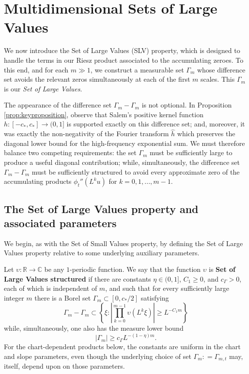 \documentclass[12pt]{amsart}
\numberwithin{equation}{section}
\begin{document}
\section{Multidimensional Sets of Large Values}\label{sec:multiSLV}

We now introduce the Set of Large Values (SLV) property, which is designed to handle the terms in our Riesz product associated to the accumulating zeroes. To this end, and for each $m \gg 1$, we construct a measurable set $\Gamma_m$ whose difference set avoids the relevant zeros simultaneously at each of the first $m$ scales.  This $\Gamma_m$ is our \textit{Set of Large Values}.

The appearance of the difference set $\Gamma_m-\Gamma_m$ is not optional.  In Proposition \ref{prop:keyproposition}, observe that Salem's positive kernel function $h : [-c_*,c_*] \rightarrow (0,1]$ is supported exactly on this difference set; and, moreover, it was exactly the non-negativity of the Fourier transform $\hat{h}$ which preserves the diagonal lower bound for the high-frequency exponential sum.  We must therefore balance two competing requirements:  the set $\Gamma_m$ must be sufficiently large to produce a useful diagonal contribution; while, simultaneously, the difference set $\Gamma_m-\Gamma_m$ must be sufficiently structured to avoid every approximate zero of the accumulating products $\phi_t'' (L^k u)$ for $k = 0,1,...,m-1$.

\subsection{The Set of Large Values property and associated parameters}\label{subsec:SLVset}

We begin, as with the Set of Small Values property, by defining the Set of Large Values property relative to some underlying auxiliary parameters.

\begin{definition}\label{def:SLVset}
Let $\upsilon:\mathbb R\to\mathbb C$ be any $1$-periodic function.  We say that the function $\upsilon$ is \textbf{Set of Large Values structured} if there are constants $\eta\in(0,1]$, $C_1\geq0$, and $c_\Gamma>0$, each of which is independent of $m$, and such that for every sufficiently large integer $m$ there is a Borel set $\Gamma_m\subset[0,c_*/2]$ satisfying
\[
\Gamma_m-\Gamma_m\subset
\left\{\xi:\left|\prod_{k=0}^{m-1}\upsilon(L^k\xi)\right|\geq L^{-C_1m}\right\}
\]
while, simultaneously, one also has the measure lower bound
\[
|\Gamma_m|\geq c_\Gamma L^{-(1-\eta)m}.
\]
For the chart-dependent products below, the constants are uniform in the chart and slope parameters, even though the underlying choice of set $\Gamma_m : = \Gamma_{m,t}$ may, itself, depend upon on those parameters.
\end{definition}
\end{document}

